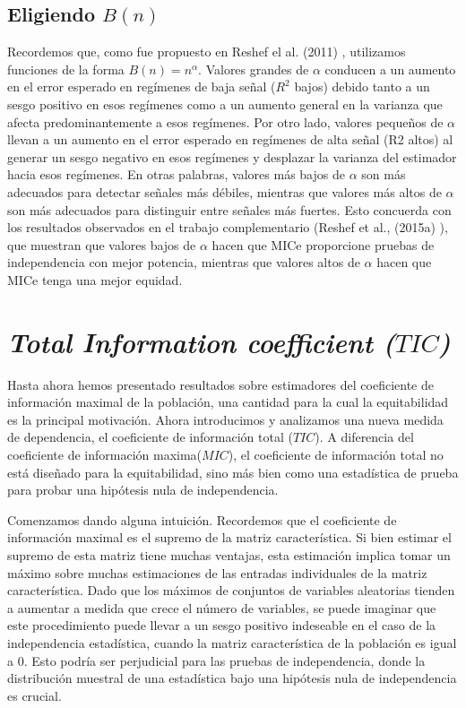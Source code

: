 	\subsection[eligiendoBn]{Eligiendo $B(n)$}\label{eligiendo_Bn}
		
	Recordemos que, como fue propuesto en Reshef el al. (2011) \cite{Reshef2011}, utilizamos funciones de la forma $B(n)=n^\alpha$. Valores grandes de $\alpha$ conducen a un aumento en el error esperado en reg\'imenes de baja se\~nal ($R^2$ bajos) debido tanto a un sesgo positivo en esos reg\'imenes como a un aumento general en la varianza que afecta predominantemente a esos reg\'imenes. Por otro lado, valores peque\~nos de $\alpha$ llevan a un aumento en el error esperado en reg\'imenes de alta se\~nal (R2 altos) al generar un sesgo negativo en esos reg\'imenes y desplazar la varianza del estimador hacia esos reg\'imenes. En otras palabras, valores m\'as bajos de $\alpha$ son m\'as adecuados para detectar se\~nales m\'as d\'ebiles, mientras que valores m\'as altos de $\alpha$ son m\'as adecuados para distinguir entre se\~nales m\'as fuertes. Esto concuerda con los resultados observados en el trabajo complementario (Reshef et al., (2015a) \cite{Reshef2015a} ), que muestran que valores bajos de $\alpha$ hacen que MICe proporcione pruebas de independencia con mejor potencia, mientras que valores altos de $\alpha$ hacen que MICe tenga una mejor equidad.


	\section[TIC]{\textit{Total Information coefficient ($TIC$)}}

	Hasta ahora hemos presentado resultados sobre estimadores del coeficiente de informaci\'on maximal de la poblaci\'on, una cantidad para la cual la equitabilidad es la principal motivaci\'on. Ahora introducimos y analizamos una nueva medida de dependencia, el coeficiente de informaci\'on total ($TIC$). A diferencia del coeficiente de informaci\'on maxima($MIC$), el coeficiente de informaci\'on total no est\'a dise\~nado para la equitabilidad, sino m\'as bien como una estad\'istica de prueba para probar una hip\'otesis nula de independencia.

	Comenzamos dando alguna intuici\'on. Recordemos que el coeficiente de informaci\'on maximal es el supremo de la matriz caracter\'istica. Si bien estimar el supremo de esta matriz tiene muchas ventajas, esta estimaci\'on implica tomar un m\'aximo sobre muchas estimaciones de las entradas individuales de la matriz caracter\'istica. Dado que los m\'aximos de conjuntos de variables aleatorias tienden a aumentar a medida que crece el n\'umero de variables, se puede imaginar que este procedimiento puede llevar a un sesgo positivo indeseable en el caso de la independencia estad\'istica, cuando la matriz caracter\'istica de la poblaci\'on es igual a 0. Esto podr\'ia ser perjudicial para las pruebas de independencia, donde la distribuci\'on muestral de una estad\'istica bajo una hip\'otesis nula de independencia es crucial.
	
